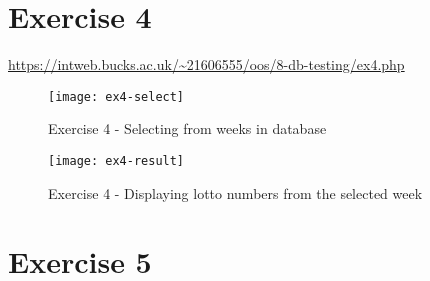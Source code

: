 \clearpage
\section{Exercise 4}

\url{https://intweb.bucks.ac.uk/~21606555/oos/8-db-testing/ex4.php}

\captionsetup{type=figure}


\begin{figure}[H]
  \caption{Exercise 4 - Selecting from weeks in database}
  \centering
  \texttt{[image: ex4-select]}
\end{figure}

\begin{figure}[H]
  \caption{Exercise 4 - Displaying lotto numbers from the selected week}
  \centering
  \texttt{[image: ex4-result]}
\end{figure}

\clearpage
\section{Exercise 5}
